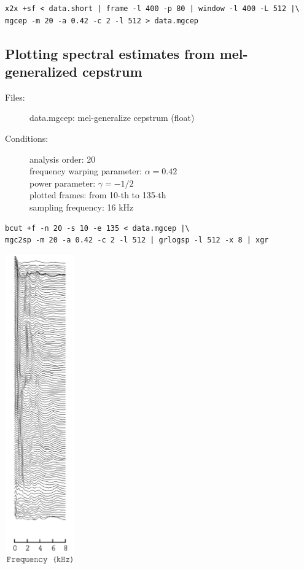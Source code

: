 \documentclass[a4paper,10pt]{article}
\begin{document}
\begin{verbatim}
x2x +sf < data.short | frame -l 400 -p 80 | window -l 400 -L 512 |\
mgcep -m 20 -a 0.42 -c 2 -l 512 > data.mgcep
\end{verbatim}

\subsection{Plotting spectral estimates from mel-generalized cepstrum}

\begin{description}
\item[Files:]
  data.mgcep: mel-generalize cepstrum (float)
\item[Conditions:]
  analysis order: 20\\
  frequency warping parameter: $\alpha = 0.42$\\
  power parameter: $\gamma = -1/2$\\
  plotted frames: from 10-th to 135-th\\
  sampling frequency: 16 kHz
\end{description}

\begin{verbatim}
bcut +f -n 20 -s 10 -e 135 < data.mgcep |\
mgc2sp -m 20 -a 0.42 -c 2 -l 512 | grlogsp -l 512 -x 8 | xgr
\end{verbatim}

\includegraphics[width=3cm]{eps/data.mgcep.grlogsp.eps}
\end{document}
